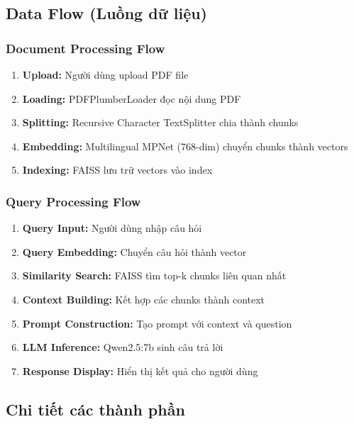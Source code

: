 \documentclass[a4paper]{article}
\begin{document}
\subsection{Data Flow (Luồng dữ liệu)} %
\subsubsection{Document Processing Flow} %
\begin{enumerate}
    \item \textbf{Upload:} Người dùng upload PDF file %
    \item \textbf{Loading:} PDFPlumberLoader đọc nội dung PDF %
    \item \textbf{Splitting:} Recursive Character TextSplitter chia thành chunks %
    \item \textbf{Embedding:} Multilingual MPNet (768-dim) chuyển chunks thành vectors %
    \item \textbf{Indexing:} FAISS lưu trữ vectors vào index %
\end{enumerate}

\subsubsection{Query Processing Flow} %
\begin{enumerate}
    \item \textbf{Query Input:} Người dùng nhập câu hỏi %
    \item \textbf{Query Embedding:} Chuyển câu hỏi thành vector %
    \item \textbf{Similarity Search:} FAISS tìm top-k chunks liên quan nhất %
    \item \textbf{Context Building:} Kết hợp các chunks thành context %
    \item \textbf{Prompt Construction:} Tạo prompt với context và question %
    \item \textbf{LLM Inference:} Qwen2.5:7b sinh câu trả lời %
    \item \textbf{Response Display:} Hiển thị kết quả cho người dùng %
\end{enumerate}

\subsection{Chi tiết các thành phần} %
\end{document}
